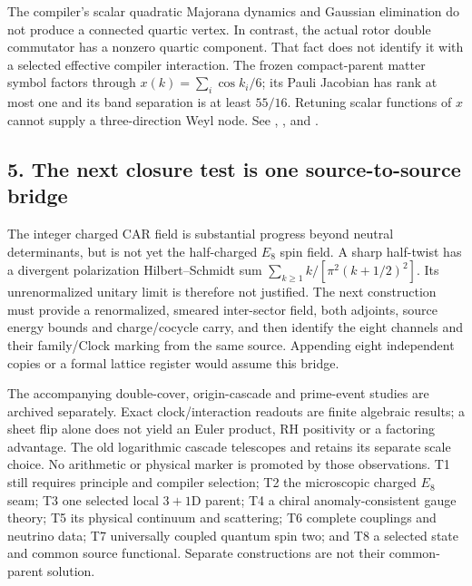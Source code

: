 The compiler's scalar quadratic Majorana dynamics and Gaussian
elimination do not produce a connected quartic vertex. In contrast,
the actual rotor double commutator has a nonzero quartic component.
That fact does not identify it with a selected effective compiler
interaction. The frozen compact-parent matter symbol factors through
$x(k)=\sum_i\cos k_i/6$; its Pauli Jacobian has rank at most one and its
band separation is at least $55/16$. Retuning scalar functions of $x$
cannot supply a three-direction Weyl node.
See , ,
 and .

\subsection*{5. The next closure test is one source-to-source bridge}
The integer charged CAR field is substantial progress beyond neutral
determinants, but is not yet the half-charged $E_8$ spin field.
A sharp half-twist has a divergent polarization Hilbert--Schmidt sum
$\sum_{k\geq1}k/[\pi^2(k+1/2)^2]$. Its unrenormalized unitary limit is
therefore not justified. The next construction must provide a
renormalized, smeared inter-sector field, both adjoints, source energy
bounds and charge/cocycle carry, and then identify the eight channels
and their family/Clock marking from the same source. Appending eight
independent copies or a formal lattice register would assume this bridge.

The accompanying double-cover, origin-cascade and prime-event studies
are archived separately. Exact clock/interaction readouts are finite
algebraic results; a sheet flip alone does not yield an Euler product,
RH positivity or a factoring advantage. The old logarithmic cascade
telescopes and retains its separate scale choice. No arithmetic or
physical marker is promoted by those observations.
T1 still requires principle and compiler selection; T2 the microscopic
charged $E_8$ seam; T3 one selected local $3{+}1$D parent; T4 a chiral
anomaly-consistent gauge theory; T5 its physical continuum and scattering;
T6 complete couplings and neutrino data; T7 universally coupled quantum
spin two; and T8 a selected state and common source functional.
Separate constructions are not their common-parent solution.
